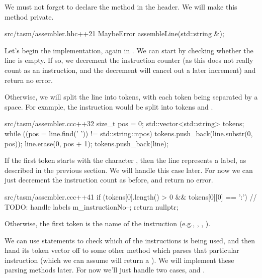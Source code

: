 We must not forget to declare the  method in the header. We will make this method private.

\begin{file}{src/tasm/assembler.hh}{c++}{21}
    MaybeError assembleLine(std::string &);
\end{file}

Let's begin the implementation, again in . We can start by checking whether the line is empty. If so, we decrement the instruction counter (as this does not really count as an instruction, and the decrement will cancel out a later increment) and return no error.

\begin{file}{src/tasm/assembler.cc}{c++}{24}
MaybeError Assembler::assembleLine(std::string &line)
{
    if (line.find_first_not_of(' ') == std::string::npos)
    {
        m_instructionNo--;
        return nullptr;
    }
\end{file}

Otherwise, we will split the line into tokens, with each token being separated by a space. For example, the instruction  would be split into tokens  and .

\begin{file}{src/tasm/assembler.cc}{c++}{32}
    size_t pos = 0;
    std::vector<std::string> tokens;
    while ((pos = line.find(' ')) != std::string::npos)
    {
        tokens.push_back(line.substr(0, pos));
        line.erase(0, pos + 1);
    }
    tokens.push_back(line);
\end{file}

If the first token starts with the character , then the line represents a label, as described in the previous section. We will handle this case later. For now we can just decrement the instruction count as before, and return no error.

\begin{file}{src/tasm/assembler.cc}{c++}{41}
    if (tokens[0].length() > 0 && tokens[0][0] == ':')
    {
        // TODO: handle labels
        m_instructionNo--;
        return nullptr;
    }
\end{file}

Otherwise, the first token is the name of the instruction (e.g., , , ).

We can use  statements to check which of the instructions is being used, and then hand its token vector off to some other method which parses that particular instruction (which we can assume will return a ). We will implement these parsing methods later. For now we'll just handle two cases,  and .

